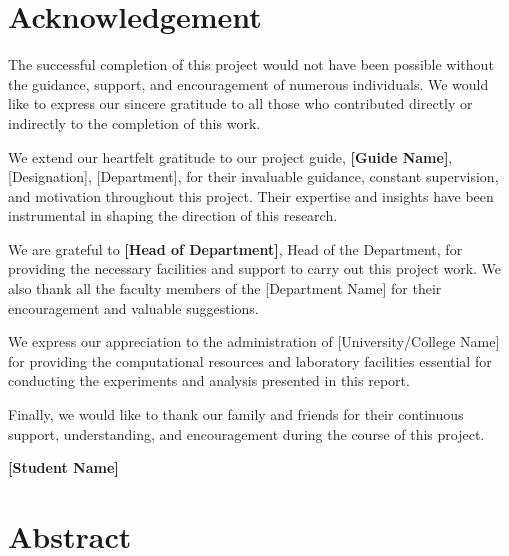 \documentclass[12pt,a4paper]{report}
\begin{document}
\chapter*{Acknowledgement}
\thispagestyle{plain}

The successful completion of this project would not have been possible without the guidance, support, and encouragement of numerous individuals. We would like to express our sincere gratitude to all those who contributed directly or indirectly to the completion of this work.

\vspace{0.5cm}

We extend our heartfelt gratitude to our project guide, \textbf{[Guide Name]}, [Designation], [Department], for their invaluable guidance, constant supervision, and motivation throughout this project. Their expertise and insights have been instrumental in shaping the direction of this research.

\vspace{0.5cm}

We are grateful to \textbf{[Head of Department]}, Head of the Department, for providing the necessary facilities and support to carry out this project work. We also thank all the faculty members of the [Department Name] for their encouragement and valuable suggestions.

\vspace{0.5cm}

We express our appreciation to the administration of [University/College Name] for providing the computational resources and laboratory facilities essential for conducting the experiments and analysis presented in this report.

\vspace{0.5cm}

Finally, we would like to thank our family and friends for their continuous support, understanding, and encouragement during the course of this project.

\vspace{2cm}

\noindent \textbf{[Student Name]}


\chapter*{Abstract}
\thispagestyle{plain}
\end{document}
